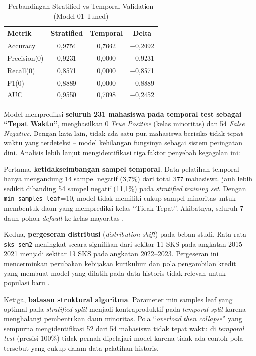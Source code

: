 \documentclass{ieeeaccess}
\begin{document}
\begin{table}[t]
\caption{Perbandingan Stratified vs Temporal Validation (Model 01-Tuned)}
\label{tab:generalization}
\begin{center}
\small
\begin{tabular}{lccc}
\hline
\textbf{Metrik} & \textbf{Stratified} & \textbf{Temporal} & \textbf{Delta} \\
\hline
Accuracy    & 0,9754 & 0,7662 & $-$0,2092 \\
Precision(0)& 0,9231 & 0,0000 & $-$0,9231 \\
Recall(0)   & 0,8571 & 0,0000 & $-$0,8571 \\
F1(0)       & 0,8889 & 0,0000 & $-$0,8889 \\
AUC         & 0,9550 & 0,7098 & $-$0,2452 \\
\hline
\end{tabular}
\end{center}
\end{table}

Model memprediksi \textbf{seluruh 231 mahasiswa pada temporal test sebagai ``Tepat Waktu''}, menghasilkan 0 \emph{True Positive} (kelas minoritas) dan 54 \emph{False Negative}. Dengan kata lain, tidak ada satu pun mahasiswa berisiko tidak tepat waktu yang terdeteksi -- model kehilangan fungsinya sebagai sistem peringatan dini. Analisis lebih lanjut mengidentifikasi tiga faktor penyebab kegagalan ini:

Pertama, \textbf{ketidakseimbangan sampel temporal}. Data pelatihan temporal hanya mengandung 14 sampel negatif (3,7\%) dari total 377 mahasiswa, jauh lebih sedikit dibanding 54 sampel negatif (11,1\%) pada \emph{stratified training set}. Dengan \texttt{min\_samples\_leaf}=10, model tidak memiliki cukup sampel minoritas untuk membentuk daun yang memprediksi kelas ``Tidak Tepat''. Akibatnya, seluruh 7 daun pohon \emph{default} ke kelas mayoritas \cite{ref22}.

Kedua, \textbf{pergeseran distribusi} (\emph{distribution shift}) pada beban studi. Rata-rata \texttt{sks\_sem2} meningkat secara signifikan dari sekitar 11 SKS pada angkatan 2015--2021 menjadi sekitar 19 SKS pada angkatan 2022--2023. Pergeseran ini mencerminkan perubahan kebijakan kurikulum dan pola pengambilan kredit yang membuat model yang dilatih pada data historis tidak relevan untuk populasi baru \cite{ref18}.

Ketiga, \textbf{batasan struktural algoritma}. Parameter min samples leaf yang optimal pada \emph{stratified split} menjadi kontraproduktif pada \emph{temporal split} karena menghalangi pembentukan daun minoritas. Pola ``\emph{overload then collapse}'' yang sempurna mengidentifikasi 52 dari 54 mahasiswa tidak tepat waktu di \emph{temporal test} (presisi 100\%) tidak pernah dipelajari model karena tidak ada contoh pola tersebut yang cukup dalam data pelatihan historis.
\end{document}
